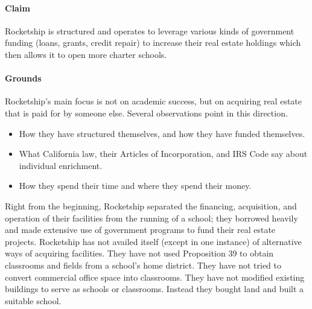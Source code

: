 \paragraph{Claim}
Rocketship is structured and operates to leverage various kinds of government funding (loans, grants, credit repair) to increase their real estate holdings which then allows it to open more charter schools.

\paragraph{Grounds}
Rocketship's main focus is not on academic success, but on acquiring real estate that is paid for by someone else. Several observations point in this direction.
\begin{itemize}
  \item How they have structured themselves, and  how they have funded themselves.
  \item What California law, their Articles of Incorporation, and IRS Code say about individual enrichment.
  \item How they spend their time and where they spend their money.
\end{itemize}

Right from the beginning, Rocketship separated the financing, acquisition, and operation of their facilities from the running of a school; they borrowed heavily and made extensive use of government programs to fund their real estate projects. Rocketship has not availed itself (except in one instance) of alternative ways of acquiring facilities. They have not used Proposition 39 to obtain classrooms and fields from a school's home district. They have not tried to convert commercial office space into classrooms. They have not modified existing buildings to serve as schools or classrooms. Instead they bought land and built a suitable school.

